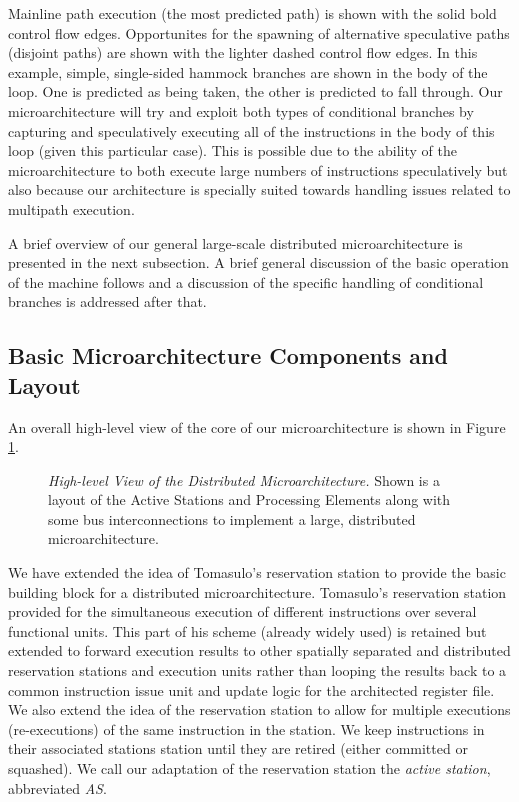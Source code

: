 \documentclass[10pt,dvips]{article}
\begin{document}
Mainline path execution (the most predicted path) is shown with the
solid bold control flow edges.  Opportunites for the spawning of alternative
speculative paths (disjoint paths) are shown with the lighter dashed
control flow edges.  In this example, simple, single-sided hammock 
branches are shown in the body of the loop.  One is predicted as
being taken, the other is predicted to fall through.  Our microarchitecture
will try and exploit both types of conditional branches by capturing
and speculatively executing
all of the instructions in the body of this loop (given this particular
case).  This is possible due to the ability of the microarchitecture to
both execute large numbers of instructions speculatively but also
because our architecture is specially suited towards handling
issues related to multipath execution.

A brief overview of our general
large-scale distributed microarchitecture is presented in the next
subsection.  A brief general discussion of the basic operation
of the machine follows and a discussion of the specific handling
of conditional branches is addressed after that.
%
\subsection{Basic Microarchitecture Components and Layout}
%
An overall high-level view of the core of our microarchitecture is shown in 
Figure \ref{fig:window}.

\begin{figure}
\centering
{}
\caption{{\em High-level View of the Distributed Microarchitecture.} 
Shown is a layout of the Active Stations and Processing Elements
along with some bus interconnections to implement a large,
distributed microarchitecture.}
\label{fig:window}
\end{figure}

We have extended the idea of Tomasulo's reservation
station \cite{Tom67} to provide the basic building block for a distributed
microarchitecture.  Tomasulo's reservation station provided for the
simultaneous execution of different instructions over several
functional units.  This part of his scheme (already widely used) is
retained but extended to forward execution results to other spatially
separated and distributed reservation stations and execution units
rather than looping the results back to a common instruction issue unit
and update logic for the architected register file.  We also extend the idea
of the reservation station to allow for multiple executions (re-executions)
of the same instruction in the station.  We keep 
instructions in their associated stations station until they are retired 
(either committed or 
squashed).  
We call our adaptation of the reservation station the
\textit{active station}, abbreviated \textit{AS}.  
\end{document}
